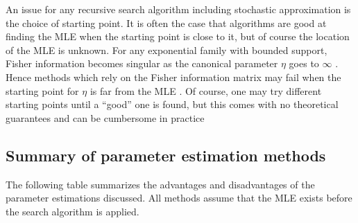 An issue for any recursive search algorithm including stochastic approximation is the 
choice of starting point.  It is 
often the case that algorithms are good at finding the MLE when the starting point is 
close to it, but of course the 
location of the MLE is unknown.  For any exponential family with bounded support, 
Fisher information 
becomes singular as the canonical parameter $\eta$ goes to $\infty$ \citep*{Rinaldo:2009}.
Hence methods which rely on 
the Fisher information matrix may fail when the starting point for $\eta$ is far from 
the MLE \citep{Younes:1989,Gu:2001}.
Of course, one may try different starting points until a ``good'' one is found, but 
this comes with no theoretical guarantees and can be cumbersome in practice

\subsection{Summary of parameter estimation methods}
The following table summarizes the advantages and disadvantages of the parameter estimations discussed.  
All methods assume that the MLE exists before the search algorithm is applied.


